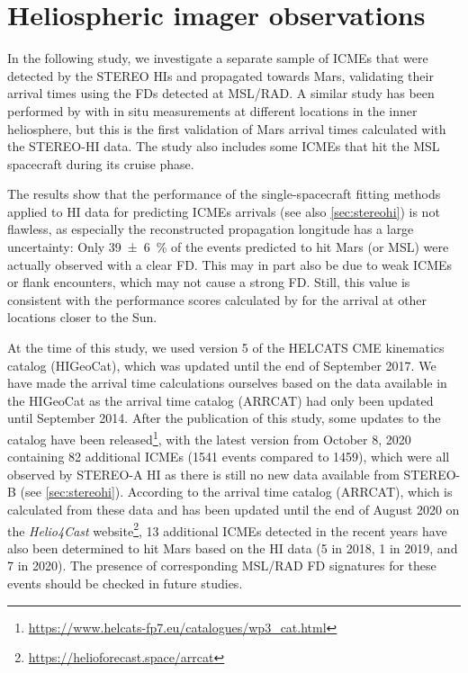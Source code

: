 

\section{Heliospheric imager observations}
In the following study, we investigate a separate sample of \acp{ICME} that were detected by the \ac{STEREO} \acp{HI} and propagated towards Mars, validating their arrival times using the \acp{FD} detected at \ac{MSL}/\ac{RAD}. A similar study has been performed by \citet{Moestl-2017-HelcatsHSO} with in situ measurements at different locations in the inner heliosphere, but this is the first validation of Mars arrival times calculated with the \ac{STEREO}-\ac{HI} data. The study also includes some \acp{ICME} that hit the \ac{MSL} spacecraft during its cruise phase.

The results show that the performance of the single-spacecraft fitting methods applied to \ac{HI} data for predicting \acp{ICME} arrivals (see also \autoref{sec:stereohi}) is not flawless, as especially the reconstructed propagation longitude has a large uncertainty: Only \SI{39+-6}{\percent} of the events predicted to hit Mars (or \ac{MSL}) were actually observed with a clear \ac{FD}. This may in part also be due to weak \acp{ICME} or flank encounters, which may not cause a strong \ac{FD}. Still, this value is consistent with the performance scores calculated by \citet{Moestl-2017-HelcatsHSO} for the arrival at other locations closer to the Sun.

At the time of this study, we used version 5 of the \acs{HELCATS} CME kinematics catalog (HIGeoCat), which was updated until the end of September 2017. We have made the arrival time calculations ourselves based on the data available in the HIGeoCat as the arrival time catalog (ARRCAT) had only been updated until September 2014.
After the publication of this study, some updates to the catalog have been released\footnote{\url{https://www.helcats-fp7.eu/catalogues/wp3_cat.html}}, with the latest version from October 8, 2020 containing 82 additional \acp{ICME} (\num{1541} events compared to \num{1459}), which were all observed by \ac{STEREO}-A \ac{HI} as there is still no new data available from \ac{STEREO}-B (see \autoref{sec:stereohi}). According to the arrival time catalog (ARRCAT), which is calculated from these data and has been updated until the end of August 2020 on the \textit{Helio4Cast} website\footnote{\url{https://helioforecast.space/arrcat}}, 13 additional \acp{ICME} detected in the recent years have also been determined to hit Mars based on the \ac{HI} data (5 in 2018, 1 in 2019, and 7 in 2020). The presence of corresponding \ac{MSL}/\ac{RAD} \ac{FD} signatures for these events should be checked in future studies.

